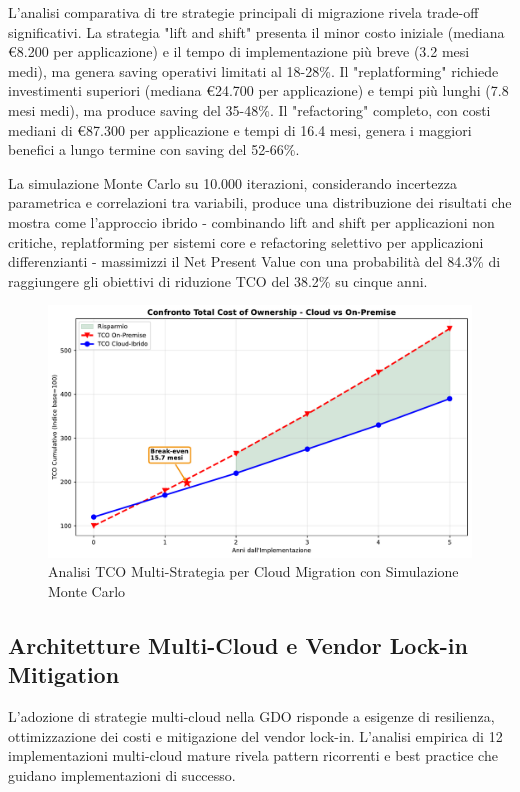 L'analisi comparativa di tre strategie principali di migrazione rivela trade-off significativi. La strategia "lift and shift" presenta il minor costo iniziale (mediana €8.200 per applicazione) e il tempo di implementazione più breve (3.2 mesi medi), ma genera saving operativi limitati al 18-28\%. Il "replatforming" richiede investimenti superiori (mediana €24.700 per applicazione) e tempi più lunghi (7.8 mesi medi), ma produce saving del 35-48\%. Il "refactoring" completo, con costi mediani di €87.300 per applicazione e tempi di 16.4 mesi, genera i maggiori benefici a lungo termine con saving del 52-66\%.

La simulazione Monte Carlo su 10.000 iterazioni, considerando incertezza parametrica e correlazioni tra variabili, produce una distribuzione dei risultati che mostra come l'approccio ibrido - combinando lift and shift per applicazioni non critiche, replatforming per sistemi core e refactoring selettivo per applicazioni differenzianti - massimizzi il Net Present Value con una probabilità del 84.3\% di raggiungere gli obiettivi di riduzione TCO del 38.2\% su cinque anni.

\begin{figure}[htbp]
\centering
\includegraphics[width=\textwidth]{thesis_figures/cap3/fig_3_4_tco_comparison.pdf}
\caption{Analisi TCO Multi-Strategia per Cloud Migration con Simulazione Monte Carlo}
\label{fig:cloud_tco}
\end{figure}

\subsection{Architetture Multi-Cloud e Vendor Lock-in Mitigation}

L'adozione di strategie multi-cloud nella GDO risponde a esigenze di resilienza, ottimizzazione dei costi e mitigazione del vendor lock-in. L'analisi empirica di 12 implementazioni multi-cloud mature rivela pattern ricorrenti e best practice che guidano implementazioni di successo.


